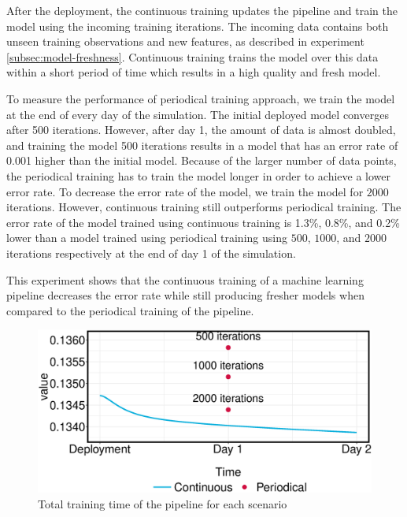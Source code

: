 After the deployment, the continuous training updates the pipeline and train the model using the incoming training iterations.
The incoming data contains both unseen training observations and new features, as described in experiment \ref{subsec:model-freshness}.
Continuous training trains the model over this data within a short period of time which results in a high quality and fresh model.

To measure the performance of periodical training approach, we train the model at the end of every day of the simulation. 
The initial deployed model converges after 500 iterations.
However, after day 1, the amount of data is almost doubled, and training the model 500 iterations results in a model that has an error rate of 0.001 higher than the initial model.
Because of the larger number of data points, the periodical training has to train the model longer in order to achieve a lower error rate.
To decrease the error rate of the model, we train the model for $2000$ iterations.
However, continuous training still outperforms periodical training.
The error rate of the model trained using continuous training is 1.3\%, 0.8\%, and 0.2\% lower than a model trained using periodical training using $500$, $1000$, and $2000$ iterations respectively at the end of day 1 of the simulation.

This experiment shows that the continuous training of a machine learning pipeline decreases the error rate while still producing fresher models when compared to the periodical training of the pipeline.


\begin{figure}[h!]
\centering
\includegraphics[width=\columnwidth]{../images/experiment-results/criteo-proactive-training-experiment.eps}
\caption{Total training time of the pipeline for each scenario}
\label{fig:loss-proactive-vs-daily}
\vspace{2mm}
\end{figure}


